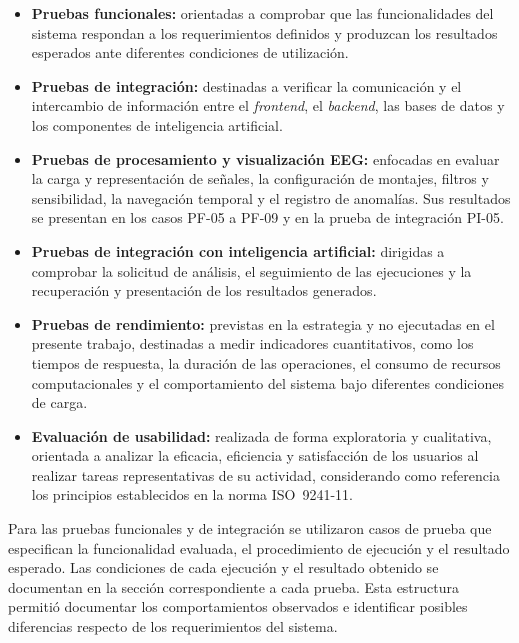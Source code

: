 \begin{itemize}
    \item \textbf{Pruebas funcionales:} orientadas a comprobar que las funcionalidades del sistema respondan a los requerimientos definidos y produzcan los resultados esperados ante diferentes condiciones de utilización.

    
    \item \textbf{Pruebas de integración:} destinadas a verificar la comunicación y el intercambio de información entre el \textit{frontend}, el \textit{backend}, las bases de datos y los componentes de inteligencia artificial.


    \item \textbf{Pruebas de procesamiento y visualización EEG:} enfocadas en evaluar la carga y representación de señales, la configuración de montajes, filtros y sensibilidad, la navegación temporal y el registro de anomalías. Sus resultados se presentan en los casos PF-05 a PF-09 y en la prueba de integración PI-05.

    \item \textbf{Pruebas de integración con inteligencia artificial:} dirigidas a comprobar la solicitud de análisis, el seguimiento de las ejecuciones y la recuperación y presentación de los resultados generados.

    \item \textbf{Pruebas de rendimiento:} previstas en la estrategia y no ejecutadas en el presente trabajo, destinadas a medir indicadores cuantitativos, como los tiempos de respuesta, la duración de las operaciones, el consumo de recursos computacionales y el comportamiento del sistema bajo diferentes condiciones de carga.

    \item \textbf{Evaluación de usabilidad:} realizada de forma exploratoria y cualitativa, orientada a analizar la eficacia, eficiencia y satisfacción de los usuarios al realizar tareas representativas de su actividad, considerando como referencia los principios establecidos en la norma ISO~9241-11.
\end{itemize}


Para las pruebas funcionales y de integración se utilizaron casos de prueba que especifican la funcionalidad evaluada, el procedimiento de ejecución y el resultado esperado. Las condiciones de cada ejecución y el resultado obtenido se documentan en la sección correspondiente a cada prueba. Esta estructura permitió documentar los comportamientos observados e identificar posibles diferencias respecto de los requerimientos del sistema.


